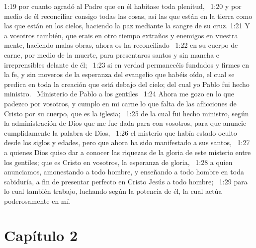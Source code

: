 1:19 por cuanto agradó al Padre que en él habitase toda plenitud,  
1:20 y por medio de él reconciliar consigo todas las cosas, así las que están en la tierra como las que están en los cielos, haciendo la paz mediante la sangre de su cruz. 
1:21 Y a vosotros también, que erais en otro tiempo extraños y enemigos en vuestra mente, haciendo malas obras, ahora os ha reconciliado  
1:22 en su cuerpo de carne, por medio de la muerte, para presentaros santos y sin mancha e irreprensibles delante de él;  
1:23 si en verdad permanecéis fundados y firmes en la fe, y sin moveros de la esperanza del evangelio que habéis oído, el cual se predica en toda la creación que está debajo del cielo; del cual yo Pablo fui hecho ministro.  
Ministerio de Pablo a los gentiles  
1:24 Ahora me gozo en lo que padezco por vosotros, y cumplo en mi carne lo que falta de las aflicciones de Cristo por su cuerpo, que es la iglesia;  
1:25 de la cual fui hecho ministro, según la administración de Dios que me fue dada para con vosotros, para que anuncie cumplidamente la palabra de Dios,  
1:26 el misterio que había estado oculto desde los siglos y edades, pero que ahora ha sido manifestado a sus santos,  
1:27 a quienes Dios quiso dar a conocer las riquezas de la gloria de este misterio entre los gentiles; que es Cristo en vosotros, la esperanza de gloria,  
1:28 a quien anunciamos, amonestando a todo hombre, y enseñando a todo hombre en toda sabiduría, a fin de presentar perfecto en Cristo Jesús a todo hombre;  
1:29 para lo cual también trabajo, luchando según la potencia de él, la cual actúa poderosamente en mí.  
\section*{Capítulo 2 }

